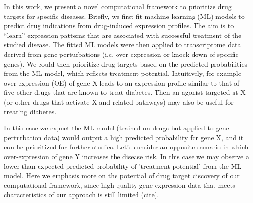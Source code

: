 In this work, we present a novel computational framework to prioritize drug targets for specific diseases. Briefly, we first fit machine learning (ML) models to predict drug indications from drug-induced expression profiles. The aim is to “learn” expression patterns that are associated with successful treatment of the studied disease. The fitted ML models were then applied to transcriptome data derived from gene perturbations (i.e. over-expression or knock-down of specific genes). We could then prioritize drug targets based on the predicted probabilities from the ML model, which reflects treatment potential. Intuitively, for example over-expression (OE) of gene X leads to an expression profile similar to that of five other drugs that are known to treat diabetes. Then an agonist targeted at X (or other drugs that activate X and related pathways) may also be useful for treating diabetes. 

In this case we expect the ML model (trained on drugs but applied to gene perturbation data) would output a high predicted probability for gene X, and it can be prioritized for further studies. Let’s consider an opposite scenario in which over-expression of gene Y increases the disease risk. In this case we may observe a lower-than-expected predicted probability of ‘treatment potential’ from the ML model. Here we emphasis more on the potential of drug target discovery of our computational framework, since high quality gene expression data that meets characteristics of our approach is still limited (cite). 



\chapterend